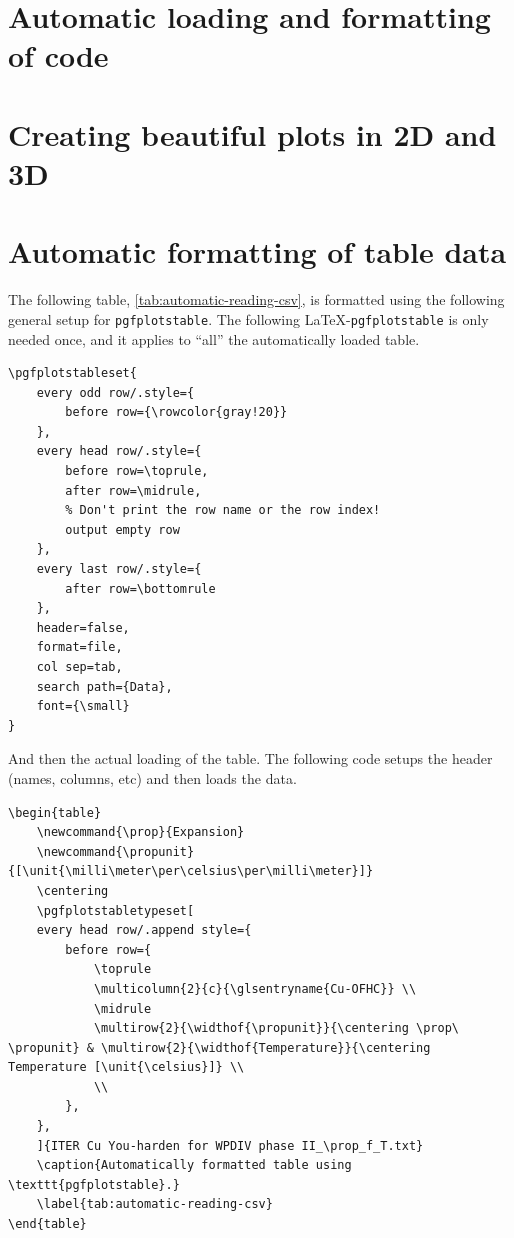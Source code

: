 \section{Automatic loading and formatting of code}

\section{Creating beautiful plots in 2D and 3D}

\section{Automatic formatting of table data} \label{sec:pgfplotstable}

The following table, \cref{tab:automatic-reading-csv}, is formatted using the following general setup for \verb|pgfplotstable|. The following \LaTeX-\verb|pgfplotstable| is only needed once, and it applies to ``all'' the automatically loaded table.

\begin{lstlisting}[language={[LaTeX]TeX}]
% Configure the general setting of pgfplotstable
\pgfplotstableset{
	every odd row/.style={
		before row={\rowcolor{gray!20}}
	},
	every head row/.style={
		before row=\toprule,
		after row=\midrule,
		% Don't print the row name or the row index!
		output empty row
	},
	every last row/.style={
		after row=\bottomrule
	},
	header=false,
	format=file,
	col sep=tab,
	search path={Data},
	font={\small}
}
\end{lstlisting}

And then the actual loading of the table. The following code setups the header (names, columns, etc) and then loads the data.
\begin{lstlisting}[language={[LaTeX]TeX}]
\begin{table}
	\newcommand{\prop}{Expansion}
	\newcommand{\propunit}{[\unit{\milli\meter\per\celsius\per\milli\meter}]}
	\centering
	\pgfplotstabletypeset[
	every head row/.append style={
		before row={
			\toprule
			\multicolumn{2}{c}{\glsentryname{Cu-OFHC}} \\
			\midrule
			\multirow{2}{\widthof{\propunit}}{\centering \prop\ \propunit} & \multirow{2}{\widthof{Temperature}}{\centering Temperature [\unit{\celsius}]} \\
			\\
		},
	},
	]{ITER Cu You-harden for WPDIV phase II_\prop_f_T.txt}
	\caption{Automatically formatted table using \texttt{pgfplotstable}.}
	\label{tab:automatic-reading-csv}
\end{table}
\end{lstlisting}

